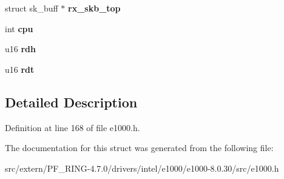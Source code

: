 \begin{DoxyCompactItemize}
\item 
\hypertarget{structe1000__rx__ring_a3b761e2fce08f25002baccde77bb5c34}{
struct sk\_\-buff $\ast$ {\bfseries rx\_\-skb\_\-top}}
\label{structe1000__rx__ring_a3b761e2fce08f25002baccde77bb5c34}

\item 
\hypertarget{structe1000__rx__ring_ac24ebbedb917e79dd545de279830d0b4}{
int {\bfseries cpu}}
\label{structe1000__rx__ring_ac24ebbedb917e79dd545de279830d0b4}

\item 
\hypertarget{structe1000__rx__ring_a9cb87885b37aa64d8c62771b51ca3b31}{
u16 {\bfseries rdh}}
\label{structe1000__rx__ring_a9cb87885b37aa64d8c62771b51ca3b31}

\item 
\hypertarget{structe1000__rx__ring_a07909e5bfb6fece37825cdcda16b54de}{
u16 {\bfseries rdt}}
\label{structe1000__rx__ring_a07909e5bfb6fece37825cdcda16b54de}

\end{DoxyCompactItemize}


\subsection{Detailed Description}


Definition at line 168 of file e1000.h.



The documentation for this struct was generated from the following file:\begin{DoxyCompactItemize}
\item 
src/extern/PF\_\-RING-\/4.7.0/drivers/intel/e1000/e1000-\/8.0.30/src/e1000.h\end{DoxyCompactItemize}
